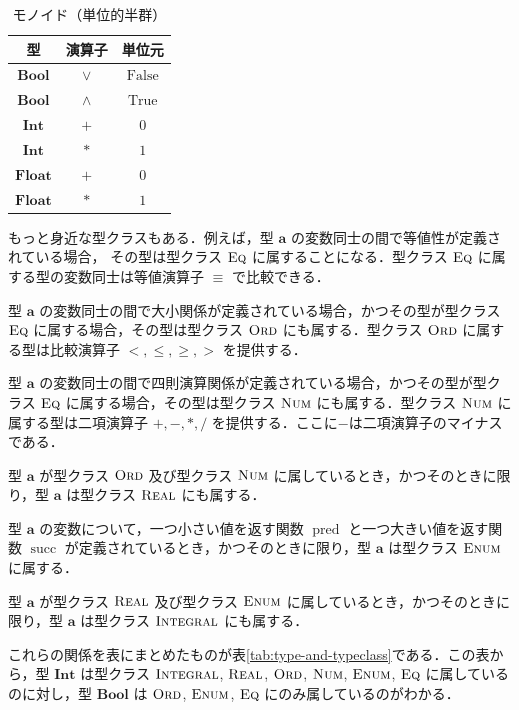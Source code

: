 \documentclass[a4paper,twocolumn]{jsbook}
\newcommand{\mSpecialConst}[1]{\mathrm{#1}} %
\newcommand{\mFalse}{\mSpecialConst{False}}
\newcommand{\mTrue}{\mSpecialConst{True}}
\DeclareMathOperator{\mPred}{pred}
\DeclareMathOperator{\mSucc}{succ}
\newcommand{\mType}[1]{\mathbf{#1}}
\newcommand{\mBoolType}{\mType{Bool}}
\newcommand{\mFloatType}{\mType{Float}}
\newcommand{\mIntType}{\mType{Int}}
\newcommand{\mSpecialTypeClass}[1]{\textsc{#1}} %
\newcommand{\mEnumTypeClass}{\mSpecialTypeClass{Enum}}
\newcommand{\mEqTypeClass}{\mSpecialTypeClass{Eq}}
\newcommand{\mIntegralTypeClass}{\mSpecialTypeClass{Integral}}
\newcommand{\mNumTypeClass}{\mSpecialTypeClass{Num}}
\newcommand{\mOrdTypeClass}{\mSpecialTypeClass{Ord}}
\newcommand{\mRealTypeClass}{\mSpecialTypeClass{Real}}
\begin{document}
\begin{table}
\caption{モノイド（単位的半群）}
\label{tab:monoids}
\begin{center}
\begin{tabular}{||c||c|c||}
\hline
型
    &演算子
    &単位元\\
\hline\hline
$\mBoolType$
    &$\vee$
    &$\mFalse$\\
\hline
$\mBoolType$
    &$\wedge$
    &$\mTrue$\\
\hline
$\mIntType$
    &$+$
    &$0$\\
\hline
$\mIntType$
    &$*$
    &$1$\\
\hline
$\mFloatType$
    &$+$
    &$0$\\
\hline
$\mFloatType$
    &$*$
    &$1$\\
\hline
\end{tabular}
\end{center}
\end{table}


もっと身近な型クラスもある．例えば，型 $\mType{a}$ の変数同士の間で等値性が定義されている場合，
その型は型クラス $\mEqTypeClass$ に属することになる．型クラス $\mEqTypeClass$ に属する型の変数同士は等値演算子 $\equiv$ で比較できる．

型 $\mType{a}$ の変数同士の間で大小関係が定義されている場合，かつその型が型クラス $\mEqTypeClass$ に属する場合，その型は型クラス $\mOrdTypeClass$ にも属する．型クラス $\mOrdTypeClass$ に属する型は比較演算子 $<,\le,\ge,>$ を提供する．

型 $\mType{a}$ の変数同士の間で四則演算関係が定義されている場合，かつその型が型クラス $\mEqTypeClass$ に属する場合，その型は型クラス $\mNumTypeClass$ にも属する．型クラス $\mNumTypeClass$ に属する型は二項演算子 $+,-,*,/$ を提供する．ここに$-$は二項演算子のマイナスである．

型 $\mType{a}$ が型クラス $\mOrdTypeClass$ 及び型クラス $\mNumTypeClass$ に属しているとき，かつそのときに限り，型 $\mType{a}$ は型クラス $\mRealTypeClass$ にも属する．

型 $\mType{a}$ の変数について，一つ小さい値を返す関数 $\mPred$ と一つ大きい値を返す関数 $\mSucc$ が定義されているとき，かつそのときに限り，型 $\mType{a}$ は型クラス $\mEnumTypeClass$ に属する．

型 $\mType{a}$ が型クラス $\mRealTypeClass$ 及び型クラス $\mEnumTypeClass$ に属しているとき，かつそのときに限り，型 $\mType{a}$ は型クラス $\mIntegralTypeClass$ にも属する．

これらの関係を表にまとめたものが表\ref{tab:type-and-typeclass}である．この表から，型 $\mIntType$ は型クラス $\mIntegralTypeClass$, $\mRealTypeClass$, $\mOrdTypeClass$, $\mNumTypeClass$, $\mEnumTypeClass$, $\mEqTypeClass$ に属しているのに対し，型 $\mBoolType$ は $\mOrdTypeClass$, $\mEnumTypeClass$, $\mEqTypeClass$ にのみ属しているのがわかる．
\end{document}
